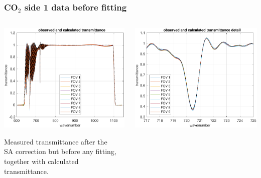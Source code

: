 \documentclass[9pt]{beamer}
\begin{document}
\begin{frame}
\frametitle{CO$_2$ side 1 data before fitting}
\begin{columns}[t]
\begin{column}{0.5\textwidth}  
  \begin{centering}
  \includegraphics[width=\textwidth]{02-11_mn_s1_CO2/spec_test2_all.pdf}
  \end{centering}\vspace{3mm}

Measured transmittance after the \\ SA correction but before any
fitting, together with calculated transmittance.

\end{column}

\begin{column}{0.5\textwidth}
  \begin{centering}
  \includegraphics[width=\textwidth]{02-11_mn_s1_CO2/spec_test2_zoom.pdf}
  \end{centering}\vspace{3mm}


\end{column}
\end{columns}
\end{frame}
\end{document}
